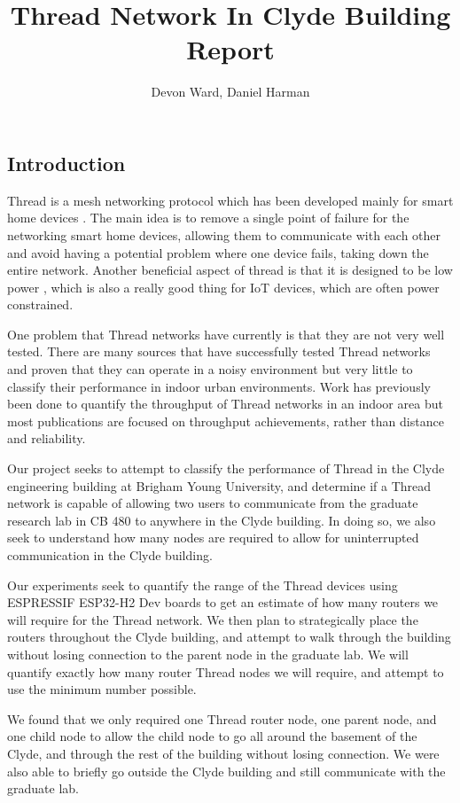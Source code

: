 \documentclass[letterpaper,twocolumn,10pt]{article}
\title{Thread Network In Clyde Building Report}
\author{Devon Ward, Daniel Harman}
\begin{document}
\maketitle

\subsection*{Introduction}

Thread is a mesh networking protocol which has been developed mainly for smart home devices \cite*{thread_website}. The main idea is to remove a single point of failure for the networking smart home devices, allowing them to communicate with each other and avoid having a potential problem where one device fails, taking down the entire network. Another beneficial aspect of thread is that it is designed to be low power \cite*{Thread_paper_1}, which is also a really good thing for IoT devices, which are often power constrained. 

One problem that Thread networks have currently is that they are not very well tested. There are many sources that have successfully tested Thread networks and proven that they can operate in a noisy environment \cite*{Thread_noisy_env} but very little to classify their performance in indoor urban environments. Work has previously been done to quantify the throughput of Thread networks in an indoor area \cite*{Thread_on_drones} but most publications are focused on throughput achievements, rather than distance and reliability.  

Our project seeks to attempt to classify the performance of Thread in the Clyde engineering building at Brigham Young University, and determine if a Thread network is capable of allowing two users to communicate from the graduate research lab in CB 480 to anywhere in the Clyde building. In doing so, we also seek to understand how many nodes are required to allow for uninterrupted communication in the Clyde building. 

Our experiments seek to quantify the range of the Thread devices using ESPRESSIF ESP32-H2 Dev boards \cite*{ESP32_h_board} to get an estimate of how many routers we will require for the Thread network. We then plan to strategically place the routers throughout the Clyde building, and attempt to walk through the building without losing connection to the parent node in the graduate lab. We will quantify exactly how many router Thread nodes we will require, and attempt to use the minimum number possible.

We found that we only required one Thread router node, one parent node, and one child node to allow the child node to go all around the basement of the Clyde, and through the rest of the building without losing connection. We were also able to briefly go outside the Clyde building and still communicate with the graduate lab. 
\end{document}
